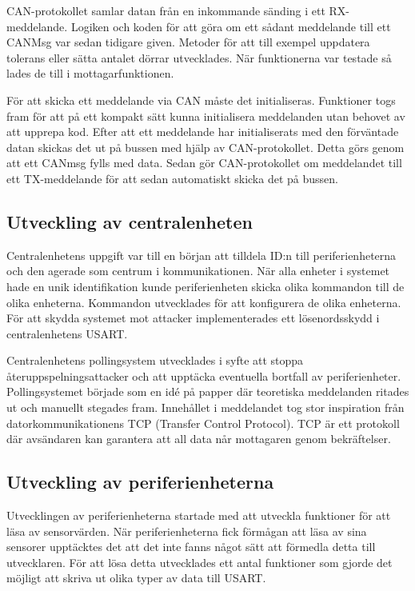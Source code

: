 \documentclass[a4paper]{article}
\begin{document}
CAN-protokollet samlar datan från en inkommande sänding i ett RX-meddelande.
Logiken och koden för att göra om ett sådant meddelande till ett CANMsg var sedan tidigare given.
Metoder för att till exempel uppdatera tolerans eller sätta antalet dörrar utvecklades.
När funktionerna var testade så lades de till i mottagarfunktionen.

För att skicka ett meddelande via CAN måste det initialiseras.
Funktioner togs fram för att på ett kompakt sätt kunna initialisera meddelanden utan behovet av att upprepa kod.
Efter att ett meddelande har initialiserats med den förväntade datan skickas det ut på bussen med hjälp av CAN-protokollet.
Detta görs genom att ett CANmsg fylls med data.
Sedan gör CAN-protokollet om meddelandet till ett TX-meddelande för att sedan automatiskt skicka det på bussen.

\subsection{Utveckling av centralenheten}
Centralenhetens uppgift var till en början att tilldela ID:n till periferienheterna och den agerade som centrum i kommunikationen.
När alla enheter i systemet hade en unik identifikation kunde periferienheten skicka olika kommandon till de olika enheterna.
Kommandon utvecklades för att konfigurera de olika enheterna.
För att skydda systemet mot attacker implementerades ett lösenordsskydd i centralenhetens USART.

Centralenhetens pollingsystem utvecklades i syfte att stoppa återuppspelningsattacker och att upptäcka eventuella bortfall av periferienheter.
Pollingsystemet började som en idé på papper där teoretiska meddelanden ritades ut och manuellt stegades fram.
Innehållet i meddelandet tog stor inspiration från datorkommunikationens TCP (Transfer Control Protocol).
TCP är ett protokoll där avsändaren kan garantera att all data når mottagaren genom bekräftelser.

\subsection{Utveckling av periferienheterna}
Utvecklingen av periferienheterna startade med att utveckla funktioner för att läsa av sensorvärden.
När periferienheterna fick förmågan att läsa av sina sensorer upptäcktes det att det inte fanns något sätt att förmedla detta till utvecklaren.
För att lösa detta utvecklades ett antal funktioner som gjorde det möjligt att skriva ut olika typer av data till USART.
\end{document}
